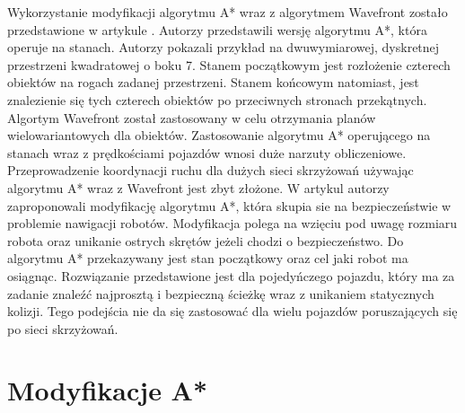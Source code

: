 \newline
\indent
Wykorzystanie modyfikacji algorytmu A* wraz z algorytmem Wavefront zostało przedstawione w artykule \cite{wojnicki2015robust}. Autorzy przedstawili wersję algorytmu A*, która operuje na stanach. Autorzy pokazali przykład na dwuwymiarowej, dyskretnej przestrzeni kwadratowej o boku 7. Stanem początkowym jest rozłożenie czterech obiektów na rogach zadanej przestrzeni. Stanem końcowym natomiast, jest znalezienie się tych czterech obiektów po przeciwnych stronach przekątnych. Algortym Wavefront został zastosowany w celu otrzymania planów wielowariantowych dla obiektów. Zastosowanie algorytmu A* operującego na stanach wraz z prędkościami pojazdów wnosi duże narzuty obliczeniowe. Przeprowadzenie koordynacji ruchu dla dużych sieci skrzyżowań używając algorytmu A* wraz z Wavefront jest zbyt złożone.
\newline
\indent
W artykul \cite{elhalawany2013modified} autorzy zaproponowali modyfikację algorytmu A*, która skupia sie na bezpieczeństwie w problemie nawigacji robotów. Modyfikacja polega na wzięciu pod uwagę rozmiaru robota oraz unikanie ostrych skrętów jeżeli chodzi o bezpieczeństwo. Do algorytmu A* przekazywany jest stan początkowy oraz cel jaki robot ma osiągnąc. Rozwiązanie przedstawione jest dla pojedyńczego pojazdu, który ma za zadanie znaleźć najprosztą i bezpieczną ścieżkę wraz z unikaniem statycznych kolizji. Tego podejścia nie da się zastosować dla wielu pojazdów poruszających się po sieci skrzyżowań.

\section{Modyfikacje A*}

